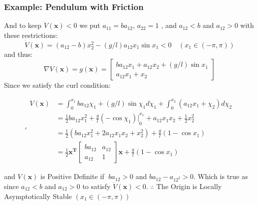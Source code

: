 \documentclass[11pt,handout]{beamer}   %
\begin{document}
\begin{frame}
\frametitle{Example: Pendulum with Friction}
\small
And to keep $\dot{V}(\mathbf{x}) < 0$ we put $a_{11} = b a_{12}$, $a_{22} = 1$ , and $a_{12}<b$ and $a_{12}>0$ with these restrictions:
\begin{equation*}
\dot{V}(\mathbf{x}) = (a_{12} - b)x_2^2 - (g/l)a_{12} x_1 \sin x_1 <0 \quad (x_1 \in (- \pi , \pi))
\end{equation*}
and thus:
\begin{equation*}
\nabla V(\mathbf{x}) = g(\mathbf{x}) = \begin{bmatrix}
b a_{12} x_1 + a_{12} x_2 + (g/l) \sin x_1\\
a_{12}x_1 + x_2
\end{bmatrix}
\end{equation*}
Since we satisfy the curl condition:
\begin{footnotesize}
\begin{equation*}'
\begin{aligned}
V(\mathbf{x}) &= \int_0^{x_1} b a_{12} \chi_1 + (g/l) \sin \chi_1 d \chi_1 + \int_0^{x_2} (a_12x_1 + \chi_2) d\chi_2\\
&= \frac{1}{2} b a_{12} x_1^2 + \left. \frac{g}{l}(-\cos \chi_1)|\right._{0}^{x_1} + a_{12}x_1x_2 + \frac{1}{2}x_2^2\\
&= \frac{1}{2} (b a_{12} x_1^2 + 2 a_{12}x_1 x_2 + x_2^2) + \frac{g}{l}(1- \cos x_1)\\
&= \frac{1}{2} \mathbf{x^T}\begin{bmatrix}
ba_{12} & a_{12} \\ a_{12} & 1
\end{bmatrix}\mathbf{x}+\frac{g}{l}(1-\cos x_1)
\end{aligned}
\end{equation*}
\end{footnotesize}
and $V(\mathbf{x})$ is Positive Definite if $\; b a_{12} >0$ and $b a_{12} - a_{12^2}>0$. Which is true as since $a_{12}<b$ and $a_{12}>0$ to satisfy $\dot{V}(\mathbf{x})<0$. $\therefore$ The Origin is Locally Asymptotically Stable $(x_1 \in (- \pi,\pi))$
\end{frame}

\end{document}
